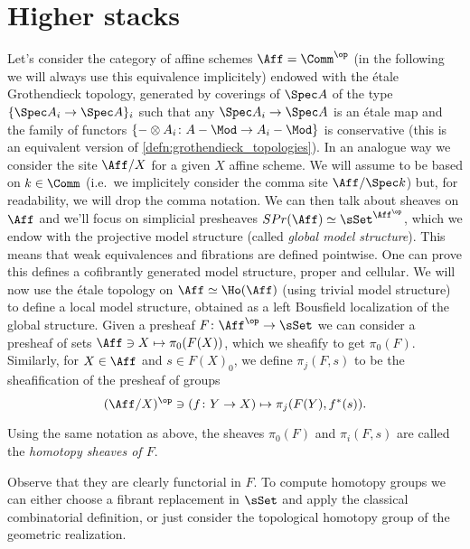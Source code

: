     \section{Higher stacks}
        Let's consider the category of affine schemes $\Aff = \Comm^{\op}$ (in the following we will always use this equivalence implicitely) endowed with the étale Grothendieck topology, generated by coverings of $\Spec A$ of the type $\{\Spec A_i \to \Spec A\}_i$ such that any $\Spec A_i \to \Spec A$ is an étale map and the family of functors $\{- \otimes A_i\colon A-\Mod \to A_i-\Mod\}$ is conservative (this is an equivalent version of \cref{defn:grothendieck_topologies}). In an analogue way we consider the site $\Aff/X$ for a given $X$ affine scheme. We will assume to be based on $k \in \Comm$ (i.e.\ we implicitely consider the comma site $\Aff/\Spec k$) but, for readability, we will drop the comma notation.\newline
        We can then talk about sheaves on $\Aff$ and we'll focus on simplicial presheaves $SPr(\Aff) \simeq \sSet^{\Aff^{\op}}$, which we endow with the projective model structure (called \emph{global model structure}). This means that weak equivalences and fibrations are defined pointwise. One can prove this defines a cofibrantly generated model structure, proper and cellular. \newline
        We will now use the étale topology on $\Aff \simeq \Ho(\Aff)$ (using trivial model structure) to define a local model structure, obtained as a left Bousfield localization of the global structure. 
        Given a presheaf $F\colon \Aff^{\op} \to \sSet$ we can consider a presheaf of sets $\Aff \ni X \mapsto \pi_0(F(X))$, which we sheafify to get $\pi_0(F)$. Similarly, for $X \in \Aff$ and $s \in F(X)_0$, we define $\pi_j(F, s)$ to be the sheafification of the presheaf of groups \[(\Aff/X)^{\op} \ni (f\colon Y \to X) \mapsto \pi_j(F(Y), f^*(s)).\] 
        \begin{defn}
            \label{defn:classical_homotopy_sheaves}
            Using the same notation as above, the sheaves $\pi_0(F)$ and $\pi_i(F, s)$ are called the \emph{homotopy sheaves of $F$}.
        \end{defn}
        Observe that they are clearly functorial in $F$. To compute homotopy groups we can either choose a fibrant replacement in $\sSet$ and apply the classical combinatorial definition, or just consider the topological homotopy group of the geometric realization.
